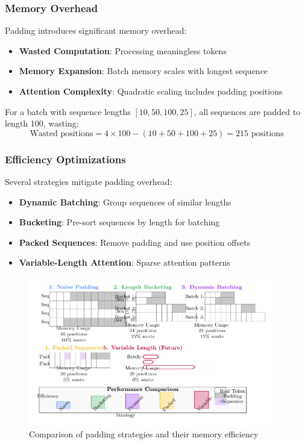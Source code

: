 \subsubsection{Memory Overhead}
Padding introduces significant memory overhead:
\begin{itemize}
\item \textbf{Wasted Computation}: Processing meaningless \pad{} tokens
\item \textbf{Memory Expansion}: Batch memory scales with longest sequence
\item \textbf{Attention Complexity}: Quadratic scaling includes padding positions
\end{itemize}

For a batch with sequence lengths $[10, 50, 100, 25]$, all sequences are padded to length 100, wasting:
$$\text{Wasted positions} = 4 \times 100 - (10 + 50 + 100 + 25) = 215 \text{ positions}$$

\subsubsection{Efficiency Optimizations}
Several strategies mitigate padding overhead:

\begin{itemize}
\item \textbf{Dynamic Batching}: Group sequences of similar lengths
\item \textbf{Bucketing}: Pre-sort sequences by length for batching
\item \textbf{Packed Sequences}: Remove padding and use position offsets
\item \textbf{Variable-Length Attention}: Sparse attention patterns
\end{itemize}

\begin{figure}[h]
\centering
\includegraphics[width=0.95\textwidth]{part1/chapter02/fig_padding_strategies.pdf}
\caption{Comparison of padding strategies and their memory efficiency}
\end{figure}

